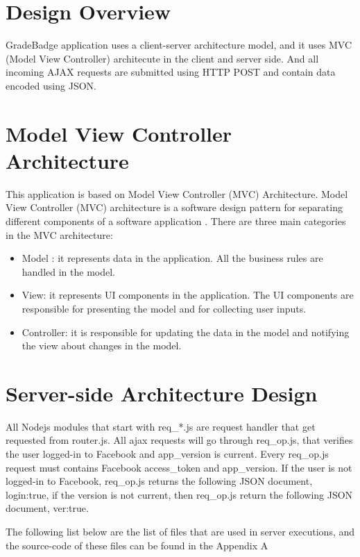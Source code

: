 
\section{Design Overview}
GradeBadge application uses a client-server architecture model, and it uses MVC (Model View Controller) architecute in the client and server side. And all incoming AJAX requests are submitted using HTTP POST and contain data encoded using JSON.    

\section{Model View Controller Architecture}
This application is based on Model View Controller (MVC) Architecture. Model View Controller (MVC) architecture is a software design pattern for separating different components of a software application \cite{MVC}. There are three main categories in the MVC architecture:

\begin{itemize}
\item Model : it represents data in the application. All the business rules are handled in the model.
\item View: it represents UI components in the application. The UI components are responsible for presenting the model and for collecting user inputs.
\item Controller: it is responsible for updating the data in the model and notifying the view about changes in the model.
\end{itemize}

\section{Server-side Architecture Design}

All Nodejs modules that start with req{\_}*.js are request handler that get requested from router.js. All ajax requests will go through req{\_}op.js, that verifies the user logged-in to Facebook and app{\_}version is current. Every req{\_}op.js request must contains Facebook access{\_}token and app{\_}version. If the user is not logged-in to Facebook, req{\_}op.js returns the following JSON document, {login:true}, if the version is not current, then req{\_}op.js return the following JSON document, {ver:true}. 

The following list below are the list of files that are used in server executions, and the source-code of these files can be found in the Appendix A

